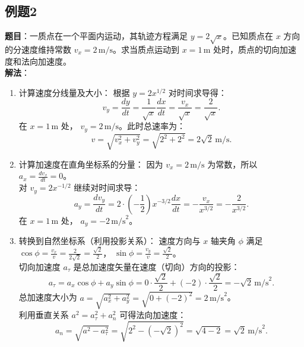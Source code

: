\documentclass[UTF8]{ctexart}
\begin{document}
	\subsection*{例题2}
	\textbf{题目}：一质点在一个平面内运动，其轨迹方程满足 $y = 2\sqrt{x}$。已知质点在 $x$ 方向的分速度维持常数 $v_x = 2\,\text{m/s}$。求当质点运动到 $x = 1\,\text{m}$ 处时，质点的切向加速度和法向加速度。\\
	\textbf{解法}：
	\begin{enumerate}
		\item 计算速度分线量及大小：
		根据 $y = 2x^{1/2}$ 对时间求导得：
		\[
		v_y = \frac{dy}{dt} = \frac{1}{\sqrt{x}}\frac{dx}{dt} = \frac{v_x}{\sqrt{x}} = \frac{2}{\sqrt{x}}.
		\]
		在 $x = 1\,\text{m}$ 处， $v_y = 2\,\text{m/s}$。此时总速率为：
		\[
		v = \sqrt{v_x^2 + v_y^2} = \sqrt{2^2 + 2^2} = 2\sqrt{2}\,\text{m/s}.
		\]
		\item 计算加速度在直角坐标系的分量：
		因为 $v_x = 2\,\text{m/s}$ 为常数，所以 $a_x = \frac{dv_x}{dt} = 0$。\\
		对 $v_y = 2x^{-1/2}$ 继续对时间求导：
		\[
		a_y = \frac{dv_y}{dt} = 2 \cdot \left(-\frac{1}{2}\right)x^{-3/2}\frac{dx}{dt} = -\frac{v_x}{x^{3/2}} = -\frac{2}{x^{3/2}}.
		\]
		在 $x = 1\,\text{m}$ 处， $a_y = -2\,\text{m/s}^2$。
		\item 转换到自然坐标系（利用投影关系）：
		速度方向与 $x$ 轴夹角 $\phi$ 满足 $\cos\phi = \frac{v_x}{v} = \frac{2}{2\sqrt{2}} = \frac{\sqrt{2}}{2}$， $\sin\phi = \frac{v_y}{v} = \frac{\sqrt{2}}{2}$。\\
		切向加速度 $a_\tau$ 是总加速度矢量在速度（切向）方向的投影：
		\[
		a_\tau = a_x\cos\phi + a_y\sin\phi = 0 \cdot \frac{\sqrt{2}}{2} + (-2) \cdot \frac{\sqrt{2}}{2} = -\sqrt{2}\,\text{m/s}^2.
		\]
		总加速度大小为 $a = \sqrt{a_x^2 + a_y^2} = \sqrt{0 + (-2)^2} = 2\,\text{m/s}^2$。\\
		利用垂直关系 $a^2 = a_\tau^2 + a_n^2$ 可得法向加速度：
		\[
		a_n = \sqrt{a^2 - a_\tau^2} = \sqrt{2^2 - (-\sqrt{2})^2} = \sqrt{4 - 2} = \sqrt{2}\,\text{m/s}^2.
		\]
	\end{enumerate}
	
\end{document}
